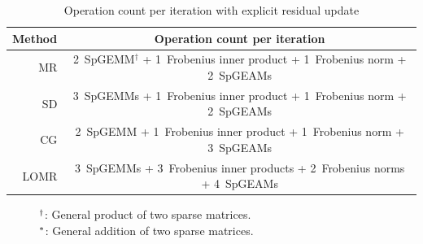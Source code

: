 \documentclass[numbers,webpdf,imanum]{ima-authoring-template}%
\theoremstyle{thmstyletwo}%
\numberwithin{equation}{section}
\begin{document}
\begin{table}
\caption{Operation count per iteration with explicit residual update}
\label{tab:operation-count-with-dropping}
\begin{tabular}{rc}
\toprule
Method & Operation count per iteration\\
\midrule
  MR & 2~SpGEMM${}^\dagger$\hphantom{s} + 1~Frobenius inner product\hphantom{s} + 1~Frobenius norm\hphantom{s} + 2~SpGEAMs\\
  SD & 3~SpGEMMs\hphantom{${}^\dagger$}\hspace{.02cm} + 1~Frobenius inner product\hphantom{s} + 1~Frobenius norm\hphantom{s} + 2~SpGEAMs\\
  CG & 2~SpGEMM\hphantom{${}^\dagger$}\hspace{.02cm}\hphantom{s} + 1~Frobenius inner product\hphantom{s} + 1~Frobenius norm\hphantom{s} + 3~SpGEAMs\\
LOMR & 3~SpGEMMs\hphantom{${}^\dagger$}\hspace{.02cm} + 3~Frobenius inner products + 2~Frobenius norms + 4~SpGEAMs\\
\bottomrule
\end{tabular}
{\footnotesize$\hspace*{1cm}{}^\dagger$: General product of two sparse matrices.}\\
{\footnotesize$\hspace*{1cm}{}^*$: General addition of two sparse matrices.}
\end{table}
\end{document}
